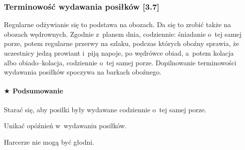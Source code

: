 \documentclass[a5paper,10pt,titlepage,twoside]{article}
\newcommand*{\thecheckbox}{\hss$\Box$} %
\newenvironment*{checklist}
{\list{}{%
\renewcommand*{\makelabel}[1]{\thecheckbox}}}
{\endlist}
\begin{document}
\subsubsection{Terminowość wydawania posiłków [3.7]}
Regularne odżywianie się to podstawa na obozach. Da się to zrobić także na obozach wędrownych. Zgodnie z~planem dnia, codziennie: śniadanie o~tej samej porze, potem regularne przerwy na szlaku, podczas których oboźny sprawia, że uczestnicy jedzą prowiant i~piją napoje, po wędrówce obiad, a~potem kolacja albo obiado--kolacja, codziennie o~tej samej porze. Dopilnowanie terminowości wydawania posiłków spoczywa na barkach oboźnego.
\paragraph{$\bigstar$ Podsumowanie}
\begin{checklist}
\item Starać się, aby posiłki były wydawane codziennie o~tej samej porze.
\item Unikać opóźnień w~wydawaniu posiłków.
\item Harcerze nie mogą być głodni.
\end{checklist}
\end{document}
